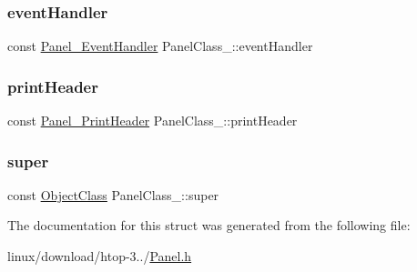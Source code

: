 \mbox{\label{structPanelClass___aeb5c12990c71db55b9bdc80c68d7be43}} 
\subsubsection{\texorpdfstring{event\+Handler}{eventHandler}}
{\footnotesize\ttfamily const \hyperlink{Panel_8h_acfe8f6b671beb37355ed5a704780fdba}{Panel\+\_\+\+Event\+Handler} Panel\+Class\+\_\+\+::event\+Handler}

\mbox{\label{structPanelClass___aad2cc041d4b4c43125a319ad92125115}} 
\subsubsection{\texorpdfstring{print\+Header}{printHeader}}
{\footnotesize\ttfamily const \hyperlink{Panel_8h_a143be7a202dfc77ec5c6ac300c8feda7}{Panel\+\_\+\+Print\+Header} Panel\+Class\+\_\+\+::print\+Header}

\mbox{\label{structPanelClass___a7a3ad0dc4f1c536d08fe6348fc14bcef}} 
\subsubsection{\texorpdfstring{super}{super}}
{\footnotesize\ttfamily const \hyperlink{Object_8h_a6feb151c3b8f61fae503dfbcdc3d6a54}{Object\+Class} Panel\+Class\+\_\+\+::super}



The documentation for this struct was generated from the following file\+:\begin{DoxyCompactItemize}
\item 
linux/download/htop-\/3../\hyperlink{Panel_8h}{Panel.\+h}\end{DoxyCompactItemize}
